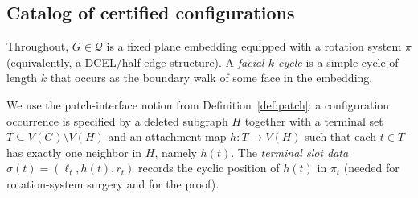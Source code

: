\documentclass[12pt]{article}
\theoremstyle{definition}
\begin{document}
\subsection{Catalog of certified configurations}
\label{subsec:catalog}

Throughout, $G\in\mathcal Q$ is a fixed plane embedding equipped with a rotation
system $\pi$ (equivalently, a DCEL/half-edge structure).
A \emph{facial $k$-cycle} is a simple cycle of length $k$ that occurs as the boundary
walk of some face in the embedding.

We use the patch-interface notion from Definition~\ref{def:patch}:
a configuration occurrence is specified by a deleted subgraph $H$ together with
a terminal set $T\subseteq V(G)\setminus V(H)$ and an attachment map
$h:T\to V(H)$ such that each $t\in T$ has exactly one neighbor in $H$, namely $h(t)$.
The \emph{terminal slot data} $\sigma(t)=(\ell_t,h(t),r_t)$ records the cyclic position of
$h(t)$ in $\pi_t$ (needed for rotation-system surgery and for the proof).

\medskip
\end{document}
